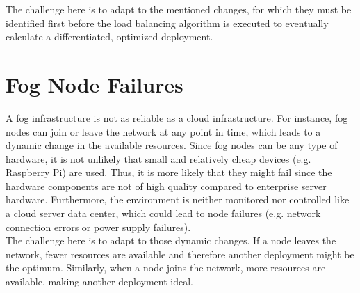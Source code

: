 The challenge here is to adapt to the mentioned changes, for which they must be identified first before the load balancing algorithm is executed to eventually calculate a differentiated, optimized deployment.

\section{Fog Node Failures}
A fog infrastructure is not as reliable as a cloud infrastructure.
For instance, fog nodes can join or leave the network at any point in time, which leads to a dynamic change in the available resources.
Since fog nodes can be any type of hardware, it is not unlikely that small and relatively cheap devices (e.g. Raspberry Pi) are used.
Thus, it is more likely that they might fail since the hardware components are not of high quality compared to enterprise server hardware.
Furthermore, the environment is neither monitored nor controlled like a cloud server data center, which could lead to node failures (e.g. network connection errors or power supply failures).\\

The challenge here is to adapt to those dynamic changes.
If a node leaves the network, fewer resources are available and therefore another deployment might be the optimum.
Similarly, when a node joins the network, more resources are available, making another deployment ideal.
